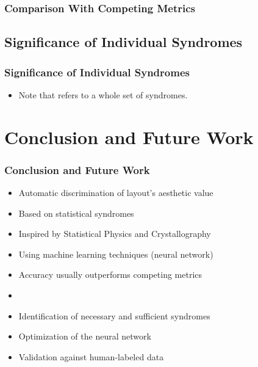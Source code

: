 \documentclass{beamer}
\begin{document}
\begin{frame}
  \frametitle{Comparison With Competing Metrics}
  \ShowDemo{}
\end{frame}

\subsection{Significance of Individual Syndromes}

\begin{frame}
  \frametitle{Significance of Individual Syndromes}
  \begin{center}
  \end{center}
  \par\vfill
  \begin{itemize}
  \item Note that  refers to a whole set of syndromes.
  \end{itemize}
\end{frame}

\section{Conclusion and Future Work}

\begin{frame}
  \frametitle{Conclusion and Future Work}
  \begin{itemize}
  \item Automatic discrimination of layout's aesthetic value
  \item Based on statistical syndromes
  \item Inspired by Statistical Physics and Crystallography
  \item Using machine learning techniques (neural network)
  \item Accuracy usually outperforms competing metrics
  \item {}
  \end{itemize}
  \par\bigskip
  \begin{itemize}
  \item Identification of necessary and sufficient syndromes
  \item Optimization of the neural network
  \item Validation against human-labeled data
  \end{itemize}
\end{frame}

\section*{\bibname}

\ResetBibliographyStyle
\begin{frame}
  \frametitle{\bibname}
  \printbibliography
\end{frame}
\end{document}
